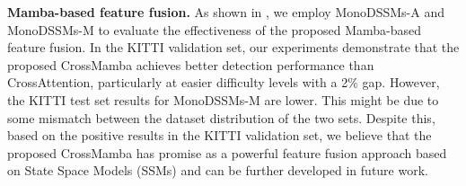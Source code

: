 \noindent\textbf{Mamba-based feature fusion.}
As shown in , we employ MonoDSSMs-A and MonoDSSMs-M to evaluate the effectiveness of the proposed Mamba-based feature fusion. In the KITTI validation set, our experiments demonstrate that the proposed CrossMamba achieves better detection performance than CrossAttention, particularly at easier difficulty levels with a 2\% gap. However, the KITTI test set results for MonoDSSMs-M are lower. This might be due to some mismatch between the dataset distribution of the two sets. Despite this, based on the positive results in the KITTI validation set, we believe that the proposed CrossMamba has promise as a powerful feature fusion approach based on State Space Models (SSMs) and can be further developed in future work.
\begin{table}[tb]
    \caption{\textbf{Comparison of different feature fusion methods} on the Car category of the KITTI dataset. `CA' denotes Cross Attention \cite{attention} module as a feature fusion method within the encoder-decoder architecture (MonoDSSMs-A). `CS6' denotes the proposed CrossMamba as an alternative approach to CA (MonoDSSMs-M).}
    \label{tab:abl_arch_2}
    \centering
\end{table}

